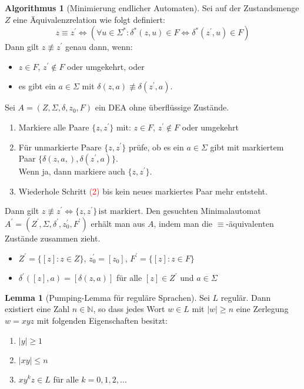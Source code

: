 \documentclass{scrreprt}
\theoremstyle{definition}
\newtheorem{Lemma}{Lemma}[section]
\theoremstyle{example}
\theoremstyle{algorithm}
\newtheorem{Algorithmus}{Algorithmus}[section]
\begin{document}
\begin{Algorithmus}[Minimierung endlicher Automaten]
Sei auf der Zustandsmenge $Z$ eine Äquivalenzrelation wie folgt definiert:
\begin{equation*}
z\equiv z^\prime \iff (\forall u\in \Sigma^*: \delta^*(z,u)\in F \Leftrightarrow \delta^*(z^\prime,u)\in F)
\end{equation*}
Dann gilt $z\not\equiv z^\prime$ genau dann, wenn:
\begin{itemize}[$\vartriangleright$]
\item
$z\in F$, $z^\prime \not\in F$ oder umgekehrt, oder
\item
es gibt ein $a\in\Sigma$ mit $\delta(z,a) \not\equiv \delta(z^\prime, a)$.
\end{itemize}
Sei $A=(Z,\Sigma,\delta,z_0,F)$ ein DEA ohne überflüssige Zustände.
\begin{framed}
\begin{enumerate}
\item
Markiere alle Paare $\{z,z^\prime\}$ mit: $z\in F$, $z^\prime \not\in F$ oder umgekehrt
\item
Für unmarkierte Paare $\{z,z^\prime\}$ prüfe, ob es ein $a\in\Sigma$ gibt mit markiertem Paar $\{\delta(z,a,),\delta(z^\prime,a)\}$.\\
Wenn ja, dann markiere auch $\{z,z^\prime\}$.
\item
Wiederhole Schritt \textcolor{red}{(2)} bis kein neues markiertes Paar mehr entsteht.
\end{enumerate}
\end{framed}
Dann gilt $z\not\equiv z^\prime \Leftrightarrow \{z,z^\prime\}\,\text{ist markiert}$. Den gesuchten Minimalautomat $A^\prime = (Z^\prime, \Sigma,\delta^\prime,z_0^\prime,F^\prime)$ erhält man aus $A$, indem man die $\equiv$-äquivalenten Zustände zusammen zieht.
\begin{itemize}[$\vartriangleright$]
\item
$Z^\prime=\{[z]:z\in Z\}$, $z_0^\prime = [z_0]$, $F^\prime=\{ [z]:z\in F\}$
\item
$\delta^\prime([z],a) = [\delta(z,a)]$ für alle $[z]\in Z^\prime$ und $a\in \Sigma$
\end{itemize}
\end{Algorithmus}

\begin{Lemma}[Pumping-Lemma für reguläre Sprachen]
Sei $L$ regulär. Dann existiert eine Zahl $n \in \mathbb{N}$, so dass jedes Wort $w \in L$ mit $|w| \geq n$ eine Zerlegung $w=xyz$ mit folgenden Eigenschaften besitzt:
\begin{enumerate}
\item
$|y|\geq 1$
\item
$|xy| \leq n$
\item
$xy^kz \in L$ für alle $k=0,1,2,\ldots$
\end{enumerate}
\end{Lemma}
\end{document}
